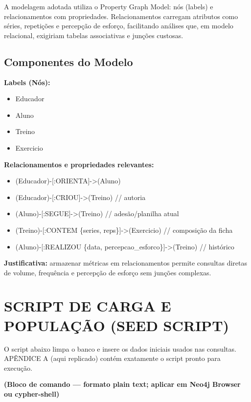 \documentclass[12pt,a4paper]{article}
\begin{document}
A modelagem adotada utiliza o Property Graph Model: nós (labels) e relacionamentos com propriedades. Relacionamentos carregam atributos como séries, repetições e percepção de esforço, facilitando análises que, em modelo relacional, exigiriam tabelas associativas e junções custosas.

\subsection{Componentes do Modelo}

\textbf{Labels (Nós):}

\begin{itemize}
    \item Educador
    \item Aluno
    \item Treino
    \item Exercicio
\end{itemize}

\textbf{Relacionamentos e propriedades relevantes:}

\begin{itemize}
    \item (Educador)-[:ORIENTA]->(Aluno)
    \item (Educador)-[:CRIOU]->(Treino) \hfill // autoria
    \item (Aluno)-[:SEGUE]->(Treino) \hfill // adesão/planilha atual
    \item (Treino)-[:CONTEM \{series, reps\}]->(Exercicio) \hfill // composição da ficha
    \item (Aluno)-[:REALIZOU \{data, percepcao\_esforco\}]->(Treino) \hfill // histórico
\end{itemize}

\textbf{Justificativa:} armazenar métricas em relacionamentos permite consultas diretas de volume, frequência e percepção de esforço sem junções complexas.

\section{SCRIPT DE CARGA E POPULAÇÃO (SEED SCRIPT)}

O script abaixo limpa o banco e insere os dados iniciais usados nas consultas. APÊNDICE A (aqui replicado) contém exatamente o script pronto para execução.

\textbf{(Bloco de comando — formato plain text; aplicar em Neo4j Browser ou cypher-shell)}
\end{document}

